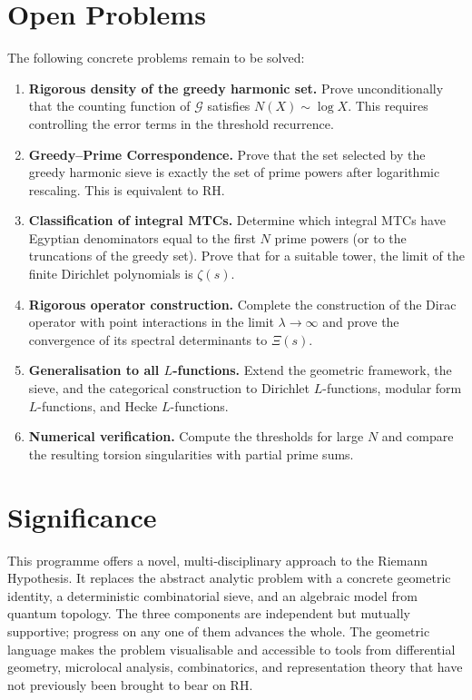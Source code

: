 \documentclass[12pt,a4paper,twoside]{book}
\begin{document}
\section{Open Problems}
The following concrete problems remain to be solved:

\begin{enumerate}[label=(\arabic*)]
\item \textbf{Rigorous density of the greedy harmonic set.}  Prove unconditionally that the counting function of \(\mathcal{G}\) satisfies \(N(X) \sim \log X\).  This requires controlling the error terms in the threshold recurrence.
\item \textbf{Greedy--Prime Correspondence.}  Prove that the set selected by the greedy harmonic sieve is exactly the set of prime powers after logarithmic rescaling.  This is equivalent to RH.
\item \textbf{Classification of integral MTCs.}  Determine which integral MTCs have Egyptian denominators equal to the first \(N\) prime powers (or to the truncations of the greedy set).  Prove that for a suitable tower, the limit of the finite Dirichlet polynomials is \(\zeta(s)\).
\item \textbf{Rigorous operator construction.}  Complete the construction of the Dirac operator with point interactions in the limit \(\lambda\to\infty\) and prove the convergence of its spectral determinants to \(\Xi(s)\).
\item \textbf{Generalisation to all \(L\)-functions.}  Extend the geometric framework, the sieve, and the categorical construction to Dirichlet \(L\)-functions, modular form \(L\)-functions, and Hecke \(L\)-functions.
\item \textbf{Numerical verification.}  Compute the thresholds for large \(N\) and compare the resulting torsion singularities with partial prime sums.
\end{enumerate}

\section{Significance}
This programme offers a novel, multi‑disciplinary approach to the Riemann Hypothesis.  It replaces the abstract analytic problem with a concrete geometric identity, a deterministic combinatorial sieve, and an algebraic model from quantum topology.  The three components are independent but mutually supportive; progress on any one of them advances the whole.  The geometric language makes the problem visualisable and accessible to tools from differential geometry, microlocal analysis, combinatorics, and representation theory that have not previously been brought to bear on RH.
\end{document}
